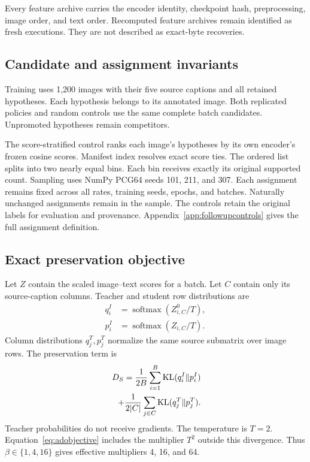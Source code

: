 Every feature archive carries the encoder identity, checkpoint hash, preprocessing, image order, and text order.
Recomputed feature archives remain identified as fresh executions.
They are not described as exact-byte recoveries.

\subsection{Candidate and assignment invariants}
Training uses 1,200 images with their five source captions and all retained hypotheses.
Each hypothesis belongs to its annotated image.
Both replicated policies and random controls use the same complete batch candidates.
Unpromoted hypotheses remain competitors.

The score-stratified control ranks each image's hypotheses by its own encoder's frozen cosine scores.
Manifest index resolves exact score ties.
The ordered list splits into two nearly equal bins.
Each bin receives exactly its original supported count.
Sampling uses NumPy PCG64 seeds 101, 211, and 307.
Each assignment remains fixed across all rates, training seeds, epochs, and batches.
Naturally unchanged assignments remain in the sample.
The controls retain the original labels for evaluation and provenance.
Appendix~\ref{app:followupcontrols} gives the full assignment definition.

\subsection{Exact preservation objective}
Let $Z$ contain the scaled image--text scores for a batch.
Let $C$ contain only its source-caption columns.
Teacher and student row distributions are
\begin{align}
q_i^I&=\operatorname{softmax}(Z^0_{i,C}/T),\\
p_i^I&=\operatorname{softmax}(Z_{i,C}/T).
\end{align}
Column distributions $q_j^T,p_j^T$ normalize the same source submatrix over image rows.
The preservation term is
\begin{align}
D_S=\frac{1}{2B}\sum_{i=1}^{B}\operatorname{KL}(q_i^I\|p_i^I)
\nonumber\\
\quad+\frac{1}{2|C|}\sum_{j\in C}\operatorname{KL}(q_j^T\|p_j^T).
\label{eq:sourcekl}
\end{align}
Teacher probabilities do not receive gradients.
The temperature is $T=2$.
Equation~\ref{eq:adobjective} includes the multiplier $T^2$ outside this divergence.
Thus $\beta\in\{1,4,16\}$ gives effective multipliers 4, 16, and 64.

